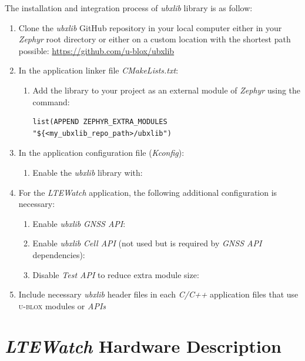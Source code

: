 \documentclass[report.tex]{subfiles}
\begin{document}
The installation and integration process of \textit{ubxlib} library is as follow:
\begin{enumerate}
\item Clone the \textit{ubxlib} GitHub repository in your local computer either in your \textit{Zephyr} root directory or either on a custom location with the shortest path possible: \url{https://github.com/u-blox/ubxlib}
\item In the application linker file \textit{CMakeLists.txt}:
\begin{enumerate}
\item Add the library to your project as an external module of \textit{Zephyr} using the  command:
\begin{lstlisting}[style=console]
list(APPEND ZEPHYR_EXTRA_MODULES "${<my_ubxlib_repo_path>/ubxlib")
\end{lstlisting}
\end{enumerate}
\item In the application configuration file (\textit{Kconfig}):
\begin{enumerate}
\item Enable the \textit{ubxlib} library with: 
\end{enumerate}
\item For the \textit{LTEWatch} application, the following additional configuration is necessary:
\begin{enumerate}
\item Enable \textit{ubxlib }\textit{GNSS API}: 
\item Enable \textit{ubxlib }\textit{Cell API} (not used but is required by \textit{GNSS API} dependencies): 
\item Disable \textit{Test API} to reduce extra module size: 
\end{enumerate}
\item Include necessary \textit{ubxlib} header files in each \textit{C/C++} application files that use \textsc{u-blox} modules or \textit{APIs}
\end{enumerate}

\pagebreak

\section{\textit{LTEWatch} Hardware Description}
\end{document}
